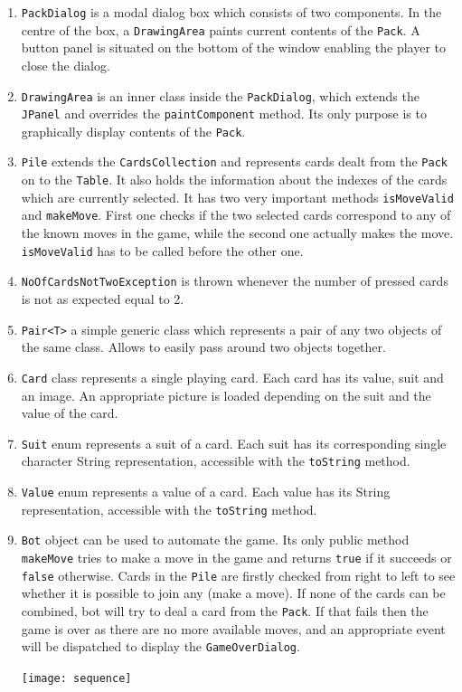 \documentclass[a4paper, 11pt, titlepage]{article}
\begin{document}
\begin{enumerate}
	\item \texttt{PackDialog} is a modal dialog box which consists of two components. 
		In the centre of the box, a \texttt{DrawingArea} paints current contents of the
		\texttt{Pack}. A button panel is situated on the bottom of the window enabling
		the player to close the dialog.  
	
	\item \texttt{DrawingArea} is an inner class inside the \texttt{PackDialog}, which 
		extends the \texttt{JPanel} and overrides the \texttt{paintComponent} method. Its
		only purpose is to graphically display contents of the \texttt{Pack}.		
	
	\item \texttt{Pile} extends the \texttt{CardsCollection} and represents cards 
		dealt from the \texttt{Pack} on to the \texttt{Table}. It also holds the 
		information about the indexes of the cards which are currently selected. It has 
		two very important methods \texttt{isMoveValid} and \texttt{makeMove}. First one 
		checks if the two selected cards correspond to any of the known moves in the 
		game, while the second one actually makes the move. \texttt{isMoveValid} has to 
		be called before the other one. 

	\item \texttt{NoOfCardsNotTwoException} is thrown whenever the number of pressed 
		cards is not as expected equal to 2. 
	
	\item \texttt{Pair<T>} a simple generic class which represents a pair of any two 
		objects of the same class. Allows to easily pass around two objects together.

	\item \texttt{Card} class represents a single playing card. Each card has its value, 
		suit and an image. An appropriate picture is loaded depending on the suit and
		the value of the card. 
	
	\item \texttt{Suit} enum represents a suit of a card. Each suit has its corresponding
		single character String representation, accessible with the \texttt{toString} 
		method.
	
	\item \texttt{Value} enum represents a value of a card. Each value has its String 
		representation, accessible with the \texttt{toString} method.

	\item \texttt{Bot} object can be used to automate the game. Its only public method
		\texttt{makeMove} tries to make a move in the game and returns \texttt{true} if
		it succeeds or \texttt{false} otherwise. Cards in the \texttt{Pile} are firstly 
		checked from right to left to see whether it is possible to join any (make a 
		move). If none of the cards can be combined, bot will try to deal a card from 
		the \texttt{Pack}. If that fails then the game is over as there are no more
		available moves, and an appropriate event will be dispatched to display the
		\texttt{GameOverDialog}.
		
		\texttt{[image: sequence]}
	
\end{enumerate}
\end{document}
